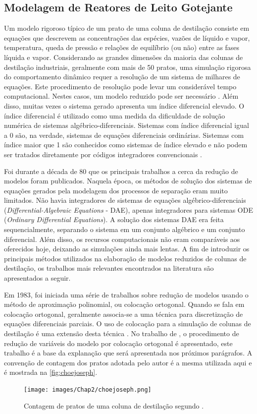 \begin{enumerate}
\section{Modelagem de Reatores de Leito Gotejante} \label{sec:modred}
Um modelo rigoroso típico de um prato de uma coluna de destilação consiste em equações que descrevem as
concentrações das espécies, vazões de líquido e vapor, temperatura, queda de pressão e relações de
equilíbrio (ou não) entre as
fases líquida e vapor. Considerando as grandes dimensões da maioria das colunas de destilação industriais, geralmente
com mais de 50 pratos, uma simulação rigorosa do comportamento dinâmico requer a resolução de um sistema de milhares
de equações. Este procedimento de resolução pode levar um considerável tempo computacional. Nestes casos, um modelo
reduzido pode ser necessário \cite{Musch:1993}. Além disso, muitas vezes o sistema
gerado apresenta um índice diferencial elevado. O índice diferencial é utilizado como uma medida da dificuldade de
solução numérica de sistemas algébrico-diferenciais. Sistemas com índice diferencial igual a 0 são, na verdade,
sistemas de equações diferenciais ordinárias. Sistemas com índice maior que 1 são conhecidos como sistemas de índice
elevado e não podem ser tratados diretamente por códigos integradores convencionais \cite{Brennan:1989}.

Foi durante a década de 80 que os principais trabalhos a cerca da redução de modelos foram publicados. Naquela época, os
métodos de solução dos sistemas de equações gerados pela modelagem dos processos de separação eram muito limitados. Não
havia integradores de sistemas de equações algébrico-diferenciais (\emph{Differential-Algebraic Equations} - DAE), apenas
integradores para sistemas ODE (\emph{Ordinary Differential Equations}). A solução dos sistemas DAE era feita
sequencialmente, separando o sistema em um conjunto algébrico e um conjunto diferencial. Além disso, os recursos
computacionais não eram comparáveis aos oferecidos hoje, deixando as simulações ainda mais lentas.
A fim de introduzir os principais métodos utilizados na elaboração de modelos reduzidos de colunas de destilação, os
trabalhos mais relevantes encontrados na literatura são apresentados a seguir.

Em 1983, foi iniciada uma série de trabalhos sobre redução de modelos usando o método de aproximação polinomial, ou
colocação ortogonal. Quando se fala em colocação ortogonal, geralmente associa-se a uma técnica para
discretização de equações diferenciais parciais. O uso de colocação para a simulação de colunas de
destilação é uma extensão desta técnica \cite{Huss:1996}.
No trabalho de , o procedimento de redução
de variáveis do modelo por colocação ortogonal é apresentado, este trabalho é
a base da explanação que será apresentada nos próximos parágrafos. A convenção de contagem dos pratos
adotada pelo autor é a mesma utilizada aqui e é mostrada na \autoref{fig:choejoseph}.
 \begin{figure}[htb]
 \centering \texttt{[image: images/Chap2/choejoseph.png]}
 \caption{Contagem de pratos de uma coluna de destilação segundo .}
 \label{fig:choejoseph}
 \end{figure}


\end{enumerate}

